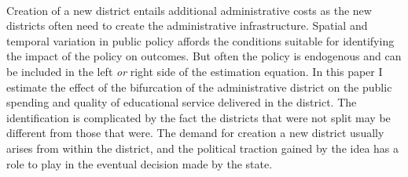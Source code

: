 \documentclass[12pt, a4paper]{article}
\begin{document}
\paragraph{} Creation of a new district entails additional administrative costs as the new districts often need to create the administrative infrastructure. Spatial and temporal variation in public policy affords the conditions suitable for identifying the impact of the policy on outcomes. But often the policy is endogenous and can be included in the left \textit{or} right side of the estimation equation. In this paper I estimate the effect of the bifurcation of the administrative district on the public spending and quality of educational service delivered in the district. The identification is complicated by the fact the districts that were not split may be different from those that were. The demand for creation a new district usually arises from within the district, and the political traction gained by the idea has a role to play in the eventual decision made by the state. 
\paragraph{} 
\printbibliography
\end{document}

